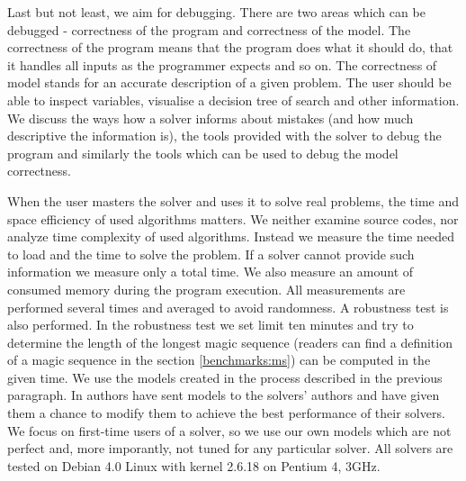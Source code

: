 Last but not least, we aim for debugging. There are two areas which can be 
debugged - correctness of the program and correctness of the model. The correctness of the
program means that the program does what it should do, that it handles all inputs as the programmer expects and so on. 
The correctness of model stands for an accurate description of a given problem. The user should be able to 
inspect variables, visualise a decision tree of search and other information. 
We discuss the ways how a solver informs about mistakes (and how much descriptive the 
information is), the tools provided with the solver to debug the program and similarly the 
tools which can be used to debug the model correctness.

When the user masters the solver and uses it to solve real problems, the time and space 
efficiency of used algorithms matters. We neither examine source codes, nor analyze 
time complexity of used algorithms. Instead we measure the time needed to 
load and the time to solve the problem. If a solver cannot provide such information 
we measure only a total time. We also measure an amount of consumed memory 
during the program execution. All measurements are performed several times 
and averaged to avoid randomness. A robustness test is also performed. 
In the robustness test we set limit ten minutes and try to determine the length of the longest magic 
sequence (readers can find a definition of a magic sequence in the section \ref{benchmarks:ms}) 
can be computed in the given time. We use the models created in the process described in the previous 
paragraph. In \cite{fernandez00} authors have sent models to the solvers' authors and 
have given them a chance to modify them to achieve the best performance of their solvers. 
We focus on first-time users of a solver, so we use our own models which are 
not perfect and, more imporantly, not tuned for any particular solver. All solvers 
are tested on Debian 4.0 Linux with kernel 2.6.18 on Pentium 4, 3GHz.